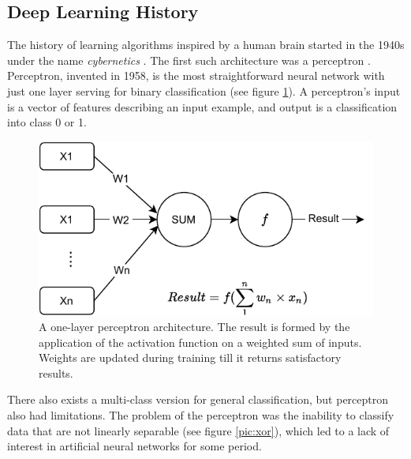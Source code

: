 \subsection{Deep Learning History}
The history of learning algorithms inspired by a human brain started in the 1940s under the name \textit{cybernetics} \citep{Goodfellow-et-al-2016, McCulloch}. The first such architecture was a perceptron \citep{Rosenblatt1958}.
Perceptron, invented in 1958, is the most straightforward neural network with just one layer serving for binary classification (see figure \ref{pic:perceptron}). A perceptron's input is a vector of features describing an input example, and output is a classification into class 0 or 1.

\begin{figure}[H]
\centering
\includegraphics[width=0.8\columnwidth]{../img/perceptron}
\caption[A one-layer perceptron architecture]{A one-layer perceptron architecture. The result is formed by the application of the activation function on a weighted sum of inputs. Weights are updated during training till it returns satisfactory results. }
\label{pic:perceptron}
\end{figure}

There also exists a multi-class version for general classification,  but perceptron also had limitations. The problem of the perceptron was the inability to classify data that are not linearly separable \citep{Minsky2017} (see figure \ref{pic:xor}), which led to a lack of interest in artificial neural networks for some period.

